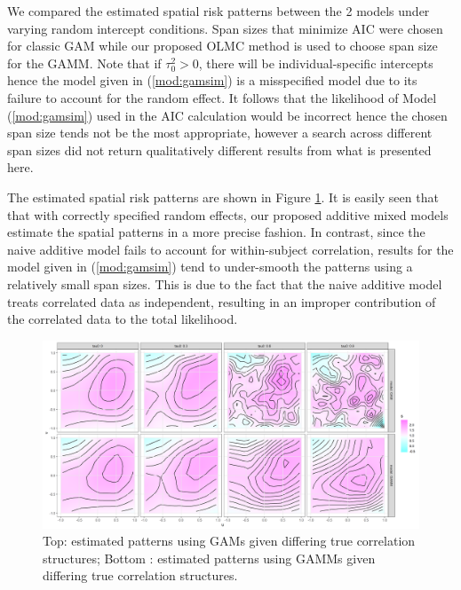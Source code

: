 	We compared the estimated spatial risk patterns between the 2 models under varying random intercept conditions. Span sizes that minimize AIC \citep{akaike1998information} were chosen for classic GAM while our proposed OLMC method is used to choose span size for the GAMM. Note that if $\tau_0^2>0$, there will be individual-specific intercepts hence the model given in (\ref{mod:gamsim}) is a misspecified model due to its failure to account for the random effect. It follows that the likelihood of Model (\ref{mod:gamsim}) used in the AIC calculation would be incorrect hence the chosen span size tends not be the most appropriate, however a search across different span sizes did not return qualitatively different results from what is presented here. 
	
	The estimated spatial risk patterns are shown in Figure \ref{f:SpatialEsts3}. It is easily seen that that with correctly specified random effects, our proposed additive mixed models estimate the spatial patterns in a more precise fashion. In contrast, since the naive additive model fails to account for within-subject correlation, results for the model given in (\ref{mod:gamsim}) tend to under-smooth the patterns using a relatively small span sizes. This is due to the fact that the naive additive model treats correlated data as independent, resulting in an improper contribution of the correlated data to the total likelihood. 
	
	\begin{figure}[h]
		\centering
		\includegraphics[width=1\linewidth]{Figures/Chap5/Comb_ests.png}
		\caption{Top: estimated patterns using GAMs given differing true correlation structures; Bottom : estimated patterns using GAMMs given differing true correlation structures.}
		\label{f:SpatialEsts3}
	\end{figure}
	
